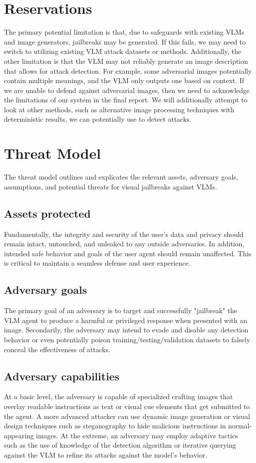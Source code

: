 \documentclass[10pt,twocolumn,letterpaper]{article}
\begin{document}
\section{Reservations}

The primary potential limitation is that, due to safeguards with existing VLMs and image generators, jailbreaks may be generated.
If this fails, we may need to switch to utilizing existing VLM attack datasets or methods.
Additionally, the other limitation is that the VLM may not reliably generate an image description that allows for attack detection.
For example, some adversarial images potentially contain multiple meanings, and the VLM only outputs one based on context.
If we are unable to defend against adversarial images, then we need to acknowledge the limitations of our system in the final report.
We will additionally attempt to look at other methods, such as alternative image processing techniques with deterministic results, we can potentially use to detect attacks.

\section{Threat Model}
The threat model outlines and explicates the relevant assets, adversary goals, assumptions, and potential threats for visual jailbreaks against VLMs.

\subsection{Assets protected}
Fundamentally, the integrity and security of the user's data and privacy should remain intact, untouched, and unleaked to any outside adversaries. In addition, intended safe behavior and goals of the user agent should remain unaffected. This is critical to maintain a seamless defense and user experience.

\subsection{Adversary goals}
The primary goal of an adversary is to target and successfully "jailbreak" the VLM agent to produce a harmful or privileged response when presented with an image. Secondarily, the adversary may intend to evade and disable any detection behavior or even potentially poison training/testing/validation datasets to falsely conceal the effectiveness of attacks.

\subsection{Adversary capabilities}
At a basic level, the adversary is capable of specialized crafting images that overlay readable instructions as text or visual cue elements that get submitted to the agent. A more advanced attacker can use dynamic image generation or visual design techniques such as steganography to hide malicious instructions in normal-appearing images. At the extreme, an adversary may employ adaptive tactics such as the use of knowledge of the detection algorithm or iterative querying against the VLM to refine its attacks against the model's behavior.
\end{document}
